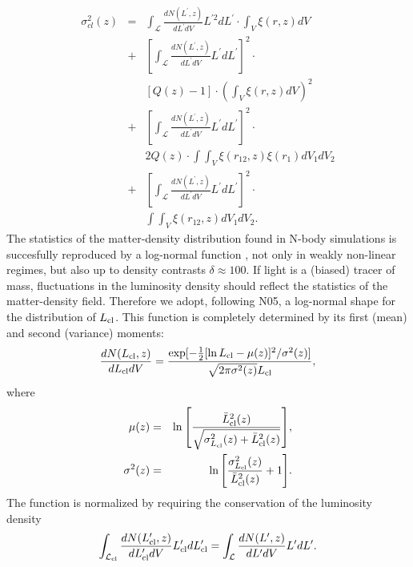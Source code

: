\documentclass[useAMS,usenatbib]{mn2e}
\begin{document}
\begin{eqnarray}\label{eq:sigma2}
\sigma^{2}_{cl}(z) & = &  \int_{\mathcal L} \frac{dN(L^{\prime},z)}{dL^{\prime}dV}
L^{\prime 2} dL^{\prime} \cdot \int_{V}\xi(r,z) dV \nonumber \\
& + & \left[ \int_{\mathcal L} \frac{dN(L^{\prime},z)}{dL^{\prime}dV}
L^{\prime} dL^{\prime} \right]^{2} \cdot
\nonumber \\
&~& [Q(z) - 1] \cdot \left(  \int_{V}\xi(r,z) dV \right)^{2}  \nonumber \\
& + & \left[ \int_{\mathcal L} \frac{dN(L^{\prime},z)}{dL^{\prime}dV}
L^{\prime} dL^{\prime} \right]^{2} \cdot \nonumber \\
&~& 2Q(z) \cdot \int\int_{V}\xi(r_{12},z)\xi(r_{1}) dV_{1}dV_{2}  \nonumber \\
& + & \left[ \int_{\mathcal L} \frac{dN(L^{\prime},z)}{dL^{\prime}dV}
L^{\prime} dL^{\prime} \right]^{2} \cdot \nonumber \\
&~& \int\int_{V}\xi(r_{12},z) dV_{1}dV_{2}.
\end{eqnarray}
%
The statistics of the matter-density distribution found in N-body
simulations is succesfully reproduced by a log-normal function
\citep{ColesJones1991,Kofman1994,TaylorWatts2000,Kayo2001,Taruya2003}, not only in weakly non-linear regimes, but also up to
density contrasts $\delta \approx 100$. If light is a (biased) tracer
of mass, fluctuations in the luminosity density should reflect the
statistics of the matter-density field. Therefore we adopt, following
N05, a log-normal shape for the distribution of $L_{\rm cl}$. This
function is completely determined by its first (mean) and second
(variance) moments:  
%
\begin{eqnarray}\label{eq:LF_clumps}
\frac{dN(L_{\rm cl},z)}{dL_{\rm cl}dV} = \frac{\exp[-\frac{1}{2}[\ln{L_{\rm cl}
    - \mu(z)}]^{2}/\sigma^{2}(z)]}{\sqrt{2\pi\sigma^{2}(z)} L_{\rm cl}},
\end{eqnarray}
%
where
%
\begin{eqnarray}
\mu(z) & = & \ln{ \left[ \frac{\bar{L}^{2}_{\rm cl}(z)}{\sqrt{\sigma^{2}_{L_{\rm cl}}(z)
      + \bar{L}^{2}_{\rm cl}(z)}} \right] }, \\
\sigma^{2}(z) & = & \ln{ \left[ \frac{\sigma^{2}_{L_{\rm cl}}(z)}{\bar{L}^{2}_{\rm cl}(z)} + 1 \right] }.
\end{eqnarray}
%
The function is normalized by requiring the conservation of the luminosity density
%
\begin{eqnarray}\label{eq:lum_dens}
\int_{\mathcal L_{\rm cl}}\frac{dN(L^{\prime}_{\rm cl},z)}{dL^{\prime}_{\rm cl}dV}L_{\rm cl}^{\prime}dL_{\rm cl}^{\prime}
= \int_{\mathcal L}\frac{dN(L^{\prime},z)}{dL^{\prime}dV}L^{\prime}dL^{\prime}.
\end{eqnarray}
%
\end{document}
